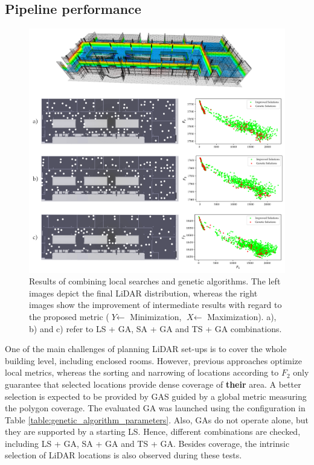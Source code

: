 \subsection{Pipeline performance}

\begin{figure}
    \centering
    \includegraphics[width=.85\linewidth]{figs/lidar_optimization/ga_results.png}
	\caption{Results of combining local searches and genetic algorithms. The left images depict the final LiDAR distribution, whereas the right images show the improvement of intermediate results with regard to the proposed metric ($\textit{Y} \gets$ Minimization, $\textit{X} \gets$ Maximization). a), b) and c) refer to LS + GA, SA + GA and TS + GA combinations. }
	\label{fig:genetic_results}
\end{figure}

One of the main challenges of planning LiDAR set-ups is to cover the whole building level, including enclosed rooms. However, previous approaches optimize local metrics, whereas the sorting and narrowing of locations according to $F_2$ only guarantee that selected locations provide dense coverage of \textbf{their} area. A better selection is expected to be provided by GAS guided by a global metric measuring the polygon coverage. The evaluated GA was launched using the configuration in Table \ref{table:genetic_algorithm_parameters}. Also, GAs do not operate alone, but they are supported by a starting LS. Hence, different combinations are checked, including LS + GA, SA + GA and TS + GA. Besides coverage, the intrinsic selection of LiDAR locations is also observed during these tests.

